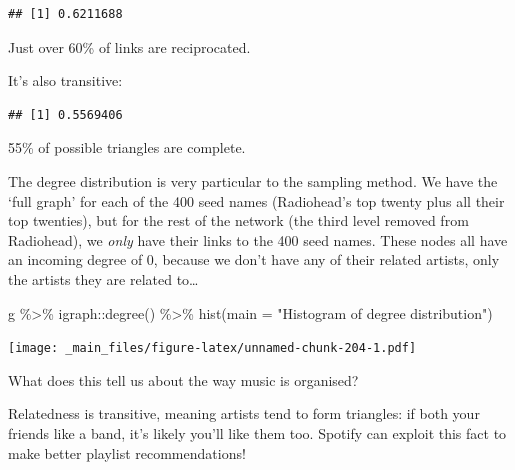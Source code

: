 \documentclass[
]{book}
\newenvironment{Shaded}{\begin{snugshade}}{\end{snugshade}}
\newcommand{\AttributeTok}[1]{\textcolor[rgb]{0.77,0.63,0.00}{#1}}
\newcommand{\FunctionTok}[1]{\textcolor[rgb]{0.00,0.00,0.00}{#1}}
\newcommand{\NormalTok}[1]{#1}
\newcommand{\SpecialCharTok}[1]{\textcolor[rgb]{0.00,0.00,0.00}{#1}}
\newcommand{\StringTok}[1]{\textcolor[rgb]{0.31,0.60,0.02}{#1}}
\begin{document}
\begin{verbatim}
## [1] 0.6211688
\end{verbatim}

Just over 60\% of links are reciprocated.

It's also transitive:

\begin{Shaded}
\end{Shaded}

\begin{verbatim}
## [1] 0.5569406
\end{verbatim}

55\% of possible triangles are complete.

The degree distribution is very particular to the sampling method. We have the `full graph' for each of the 400 seed names (Radiohead's top twenty plus all their top twenties), but for the rest of the network (the third level removed from Radiohead), we \emph{only} have their links to the 400 seed names. These nodes all have an incoming degree of 0, because we don't have any of their related artists, only the artists they are related to\ldots{}

\begin{Shaded}
\begin{Highlighting}[]
\NormalTok{g }\SpecialCharTok{\%\textgreater{}\%}\NormalTok{ igraph}\SpecialCharTok{::}\FunctionTok{degree}\NormalTok{() }\SpecialCharTok{\%\textgreater{}\%} \FunctionTok{hist}\NormalTok{(}\AttributeTok{main =} \StringTok{"Histogram of degree distribution"}\NormalTok{)}
\end{Highlighting}
\end{Shaded}

\texttt{[image: \_main\_files/figure-latex/unnamed-chunk-204-1.pdf]}

What does this tell us about the way music is organised?

Relatedness is transitive, meaning artists tend to form triangles: if both your friends like a band, it's likely you'll like them too. Spotify can exploit this fact to make better playlist recommendations!
\end{document}
